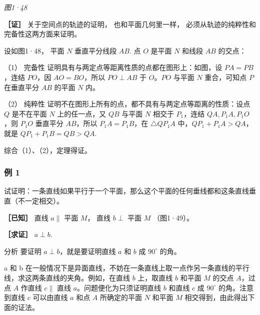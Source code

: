 \emph{图1·48}

\textbf{［证］} 关于空间点的轨迹的证明， 也和平面几何里一样，
必须从轨迹的纯粹性和完备性这两方面来证明。

设如图1·48， 平面 \(N\) 垂直平分线段 \(AB\). 点 \(O\) 是平面 \(N\)
和线段 \(AB\) 的交点：

（1） 完备性 证明具有与两定点等距离性质的点都在图形上：如图，设
\(PA = PB\)，连结 \(PO\)，因 \(AO = BO\)，所以 \(PO \perp AB\) 于
\(O\)。\(PO\) 与平面 \(N\) 重合，可知点 \(P\) 在垂直平分 \(AB\) 的平面
\(N\) 内。

（2） 纯粹性 证明不在图形上所有的点，都不具有与两定点等距离的性质：设点
\(Q\) 是不在平面 \(N\) 上的任一点，又 \(QB\) 与平面 \(N\) 相交于
\(P_{1}\)，连结 \(QA, P_{1}A, P_{1}O\)，则 \(P_{1}O\) 垂直平分
\(AB\)，所以 \(P_{1}A = P_{1}B\)，在 \(\triangle QP_{1}A\)
中，\(QP_{1} + P_{1}A > QA\)，就是 \(QP_{1} + P_{1}B = QB > QA\).

综合（1）、（2），定理得证。

\subsubsection{例 1}

试证明：一条直线如果平行于一个平面，那么这个平面的任何垂线都和这条直线垂直（不一定相交）。

\textbf{［已知］} 直线 \(a \parallel\) 平面 \(M\)， 直线 \(b \perp\)
平面 \(M\) （图1·49）。

\textbf{［求证］} \(a \perp b\).

分析 要证明 \(a \perp b\)，就是要证明直线 \(a\) 和 \(b\) 成
\(90^{\circ}\) 的角。

a 和 b
在一般情况下是异面直线，不妨在一条直线上取一点作另一条直线的平行线，求这两条直线的夹角。例如，在直线
\(b\) 上，取直线 \(b\) 和平面 \(M\) 的交点 \(A\)，过点 \(A\) 作直线
\(c \parallel\) 直线 \(a\)。问题便化为只须证明直线 \(b\) 和直线 \(c\) 成
\(90^\circ\) 的角。注意到直线 \(c\) 可以由直线 \(a\) 和点 \(A\)
所确定的平面 \(N\) 和平面 \(M\) 相交得到，由此得出下面的证法。

